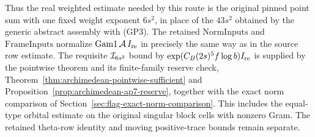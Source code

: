 Thus the real weighted estimate needed by
this route is the original pinned point sum with one
fixed weight exponent \(6s^2\), in place of the
\(43s^2\) obtained by the generic abstract assembly
with (GP3). The retained \(\mathrm{NormInputs}\) and
\(\mathrm{FrameInputs}\) normalize
\(\mathrm{Gam1}\,{\cal A}\,I_{\rm re}\) in precisely the
same way as in the source row estimate.
The requisite \({\cal I}_{6s^2}\) bound by
\(\exp(C_B(2s)^5 f\log b)I_{\rm re}\) is supplied by
the pointwise theorem and its finite-family reserve check,
Theorem~\ref{thm:archimedean-pointwise-sufficient} and
Proposition~\ref{prop:archimedean-ap7-reserve}, together
with the exact norm comparison of
Section~\ref{sec:flag-exact-norm-comparison}. This includes
the equal-type orbital estimate on the original singular
block cells with nonzero Gram. The retained theta-row
identity and moving positive-trace bounds remain separate.
